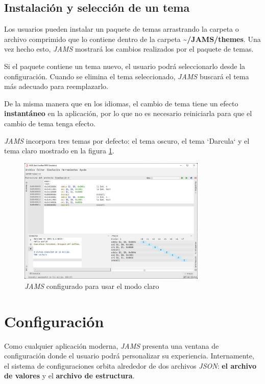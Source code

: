 \subsection{Instalación y selección de un tema}\label{subsec:instalacion-y-seleccion-de-un-tema}

Los usuarios pueden instalar un paquete de temas arrastrando la carpeta o
archivo comprimido que lo contiene dentro de la carpeta \textbf{\textasciitilde/JAMS/themes}.
Una vez hecho esto, \textit{JAMS} mostrará los cambios realizados por el paquete de temas.

Si el paquete contiene un tema nuevo, el usuario podrá seleccionarlo desde la configuración.
Cuando se elimina el tema seleccionado, \textit{JAMS}
buscará el tema más adecuado para reemplazarlo.

De la misma manera que en los idiomas, el cambio de tema tiene un
efecto \textbf{instantáneo} en la aplicación, por lo que no es necesario
reiniciarla para que el cambio de tema tenga efecto.

\textit{JAMS} incorpora tres temas por defecto: el tema oscuro, el tema `Darcula`
y el tema claro mostrado en la figura \ref{fig:jams-light-theme}.

\begin{figure}[H]
    \centering
    \includegraphics[width=0.8\textwidth]{images/base/jams-theme}
    \caption{\textit{JAMS} configurado para usar el modo claro}
    \label{fig:jams-light-theme}
\end{figure}


\section{Configuración}\label{sec:configuracion}

Como cualquier aplicación moderna, \textit{JAMS} presenta una
ventana de configuración donde el usuario podrá personalizar su experiencia.
Internamente, el sistema de configuraciones orbita
alrededor de dos archivos \textit{JSON}\cite{JSON}:
\textbf{el archivo de valores} y el \textbf{archivo de estructura}.

